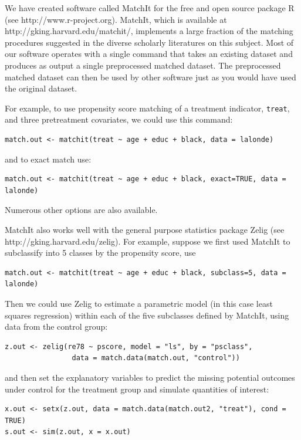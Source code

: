 \documentclass[11pt,titlepage]{article}
\begin{document}
We have created software called MatchIt for the free and open source
package R (see http://www.r-project.org).  MatchIt, which is available
at http://gking.harvard.edu/matchit/, implements a large fraction of
the matching procedures suggested in the diverse scholarly literatures
on this subject.  Most of our software operates with a single command
that takes an existing dataset and produces as output a single
preprocessed matched dataset.  The preprocessed matched dataset can
then be used by other software just as you would have used the
original dataset.

For example, to use propensity score matching of a treatment
indicator, \texttt{treat}, and three pretreatment covariates, we could
use this command:
\begin{verbatim}
match.out <- matchit(treat ~ age + educ + black, data = lalonde)
\end{verbatim}
and to exact match use:
\begin{verbatim}
match.out <- matchit(treat ~ age + educ + black, exact=TRUE, data = lalonde)
\end{verbatim}
Numerous other options are also available.

MatchIt also works well with the general purpose statistics package
Zelig (see \\ http://gking.harvard.edu/zelig).  For example, suppose we
first used MatchIt to subclassify into 5 classes by the propensity
score, use
\begin{verbatim}
match.out <- matchit(treat ~ age + educ + black, subclass=5, data = lalonde)
\end{verbatim}
Then we could use Zelig to estimate a parametric model (in this case
least squares regression) within each of the five subclasses defined
by MatchIt, using data from the control group:
\begin{verbatim}
z.out <- zelig(re78 ~ pscore, model = "ls", by = "psclass", 
                data = match.data(match.out, "control"))
\end{verbatim}
and then set the explanatory variables to predict the missing potential
outcomes under control for the treatment group and simulate quantities of interest:
\begin{verbatim}
x.out <- setx(z.out, data = match.data(match.out2, "treat"), cond = TRUE)
s.out <- sim(z.out, x = x.out)
\end{verbatim}


\baselineskip 

\end{document}
